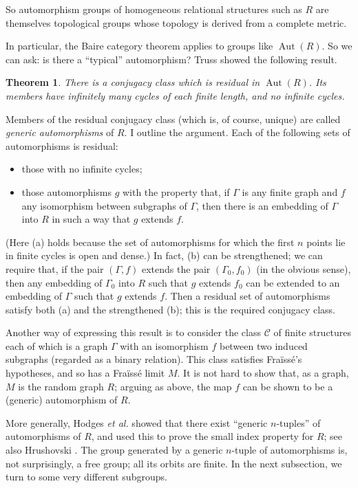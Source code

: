 \documentclass{book}
\newtheorem{theorem}{Theorem}
\DeclareMathOperator{\Aut}{Aut}
\begin{document}
So automorphism groups of homogeneous relational structures such as $R$ are
themselves topological groups whose topology is derived from a complete metric.

In particular, the Baire category theorem applies to groups like $\Aut(R)$.
So we can ask: is there a
``typical'' automorphism? Truss \cite{ch32:bib53} showed the
following result.

\begin{theorem}\label{ch32:them9.2}
There is a conjugacy class which is residual in
$\Aut(R)$. Its members have infinitely many cycles of each
finite length, and no infinite cycles.
\end{theorem}

Members of the residual conjugacy class (which is, of course,
unique) are called \emph{generic automorphisms} of $R$. I outline
the argument. Each of the following sets of automorphisms is
residual:
\begin{itemize}
\item[(a)] those with no infinite cycles;
\item[(b)] those automorphisms $g$ with the property that, 
if $\Gamma$ is any finite graph and $f$
any isomorphism between subgraphs of $\Gamma$, then there is an
embedding of $\Gamma$ into $R$ in such a way that $g$ extends $f$.
\end{itemize}
(Here (a) holds because the set of automorphisms for which the first
$n$ points lie in finite cycles is open and dense.) In fact, (b) can
be strengthened; we can require that, if the pair $(\Gamma, f)$
extends the pair $(\Gamma_0, f_0)$ (in the obvious sense), then any
embedding of $\Gamma_0$ into $R$ such that $g$ extends $f_0$ can be
extended to an embedding of $\Gamma$ such that $g$ extends $f$. Then
a residual set of automorphisms satisfy both (a) and the
strengthened (b); this is the required conjugacy class.

Another way of expressing this result is to consider the class
$\mathcal{C}$ of finite structures each of which is a graph $\Gamma$
with an isomorphism $f$ between two induced subgraphs (regarded as a
binary relation). This class satisfies Fra\"{i}ss\'{e}'s hypotheses,
and so has a Fra\"{i}ss\'{e} limit $M$. It is not hard to show that,
as a graph, $M$ is the random graph $R$; arguing as above, the map
$f$ can be shown to be a (generic) automorphism of $R$.

More generally, Hodges \textit{et al.} \cite{ch32:bib29} showed that
there exist ``generic $n$-tuples'' of automorphisms of $R$, and used
this to prove the small index property for $R$; see also Hrushovski
\cite{ch32:bib30}. The group generated by a generic $n$-tuple of
automorphisms is, not surprisingly, a free group; all its orbits are
finite. In the next subsection, we turn to some very different subgroups.
\end{document}
